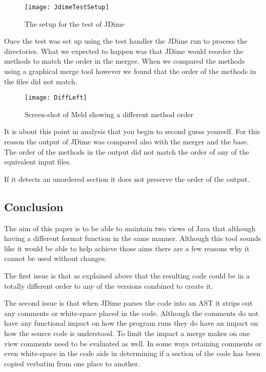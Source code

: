 \begin{figure}[h]
\begin{center}
\texttt{[image: JdimeTestSetup]}
\end{center}
 \caption{The setup for the test of JDime}
\end{figure}

Once the test was set up using the test handler the JDime run to process the directories.
What we expected to happen was that JDime would reorder the methods to match the order in the mergee. When we compared the methods using a graphical merge tool however we found that the order of the methods in the files did not match.

\begin{figure}[h]
\begin{center}
\texttt{[image: DiffLeft]}
\end{center}
 \caption{Screen-shot of Meld showing a different method order}
\end{figure}

It is about this point in analysis that you begin to second guess yourself.  For this reason the output of JDime was compared also with the merger and the base.  The order of the methods in the output did not match the order of any of the equivalent input files.  

If it detects an unordered section it does not preserve the order of the output.

\subsection{Conclusion}
The aim of this paper is to be able to maintain two views of Java that although having a different format function in the same manner.  Although this tool sounds like it would be able to help achieve those aims there are a few reasons why it cannot be used without changes.

The first issue is that as explained above that the resulting code could be in a totally different order to any of the versions combined to create it.

The second issue is that when JDime parses the code into an AST it strips out any comments or white-space placed in the code.  Although the comments do not have any functional impact on how the program runs they do have an impact on how the source code is understood.  To limit the impact a merge makes on one view comments need to be evaluated as well. In some ways retaining comments or even white-space in the code aids in determining if a section of the code has been copied verbatim from one place to another.

